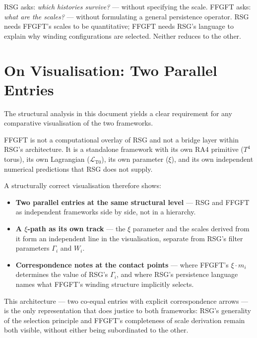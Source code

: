 \begin{keyresult}
RSG asks: \emph{which histories survive?} — without specifying the scale.
FFGFT asks: \emph{what are the scales?} — without formulating a general
persistence operator. RSG needs FFGFT's scales to be quantitative; FFGFT
needs RSG's language to explain why winding configurations are selected.
Neither reduces to the other.
\end{keyresult}

\section{On Visualisation: Two Parallel Entries}

The structural analysis in this document yields a clear requirement for any
comparative visualisation of the two frameworks.

FFGFT is not a computational overlay of RSG and not a bridge layer within
RSG's architecture. It is a standalone framework with its own RA4 primitive
($T^4$ torus), its own Lagrangian ($\mathcal{L}_{\text{T0}}$), its own
parameter ($\xi$), and its own independent numerical predictions that RSG
does not supply.

A structurally correct visualisation therefore shows:

\begin{itemize}
  \item \textbf{Two parallel entries at the same structural level} —
        RSG and FFGFT as independent frameworks side by side, not in
        a hierarchy.
  \item \textbf{A $\xi$-path as its own track} — the $\xi$ parameter
        and the scales derived from it form an independent line in
        the visualisation, separate from RSG's filter parameters
        $\Gamma_i$ and $W_i$.
  \item \textbf{Correspondence notes at the contact points} — where
        FFGFT's $\xi \cdot m_i$ determines the value of RSG's $\Gamma_i$,
        and where RSG's persistence language names what FFGFT's
        winding structure implicitly selects.
\end{itemize}

This architecture — two co-equal entries with explicit correspondence
arrows — is the only representation that does justice to both frameworks:
RSG's generality of the selection principle and FFGFT's completeness of
scale derivation remain both visible, without either being subordinated
to the other.

